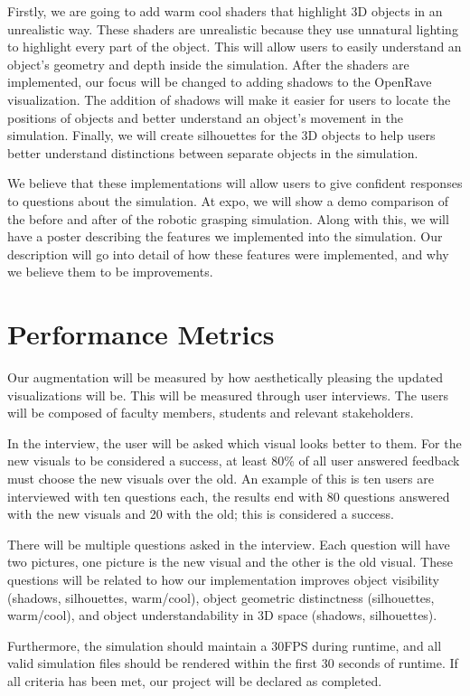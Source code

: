 \documentclass[10pt,journal,compsoc]{IEEEtran}
\begin{document}
Firstly, we are going to add warm cool shaders that highlight 3D objects in an unrealistic way. 
These shaders are unrealistic because they use unnatural lighting to highlight every part of the object. 
This will allow users to easily understand an object's geometry and depth inside the simulation.
After the shaders are implemented, our focus will be changed to adding shadows to the OpenRave visualization. 
The addition of shadows will make it easier for users to locate the positions of objects and better understand an object's movement in the simulation. 
Finally, we will create silhouettes for the 3D objects to help users better understand distinctions between separate objects in the simulation. \par

We believe that these implementations will allow users to give confident responses to questions about the simulation.
At expo, we will show a demo comparison of the before and after of the robotic grasping simulation. 
Along with this, we will have a poster describing the features we implemented into the simulation. 
Our description will go into detail of how these features were implemented, and why we believe them to be improvements.

\section{Performance Metrics}
Our augmentation will be measured by how aesthetically pleasing the updated visualizations will be.
This will be measured through user interviews.
The users will be composed of faculty members, students and relevant stakeholders. \par
In the interview, the user will be asked which visual looks better to them.
For the new visuals to be considered a success, at least 80\% of all user answered feedback must choose the new visuals over the old. 
An example of this is ten users are interviewed with ten questions each, the results end with 80 questions answered with the new visuals and 20 with the old; this is considered a success. \par
There will be multiple questions asked in the interview.
Each question will have two pictures, one picture is the new visual and the other is the old visual.
These questions will be related to how our implementation improves object visibility (shadows, silhouettes, warm/cool), object geometric distinctness (silhouettes, warm/cool), and object understandability in 3D space (shadows, silhouettes). \par
Furthermore, the simulation should maintain a 30FPS during runtime, and all valid simulation files should be rendered within the first 30 seconds of runtime.
If all criteria has been met, our project will be declared as completed.
\end{document}
